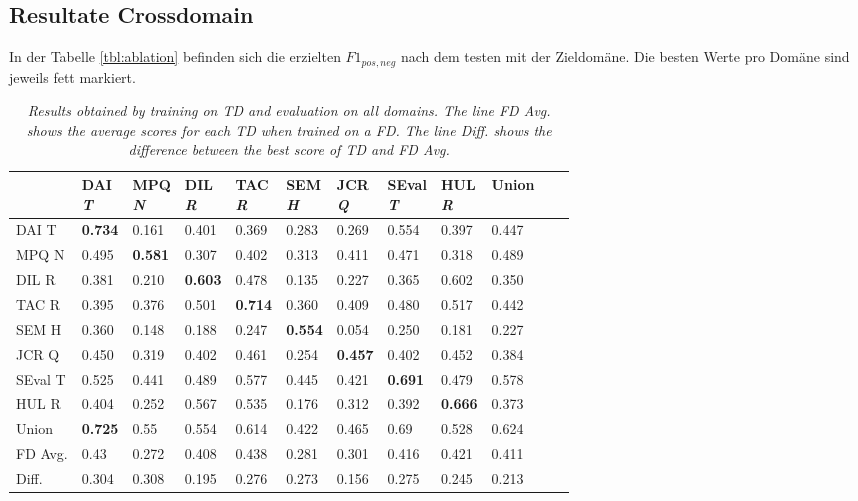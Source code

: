 \subsection{Resultate Crossdomain}\label{subsec:Resultate Crossdomain}
In der Tabelle \ref{tbl:ablation} befinden sich die erzielten $F1_{pos,neg}$ nach dem testen mit der Zieldomäne. Die besten Werte pro Domäne sind jeweils fett markiert.
\begin{table}[!t]
	\centering
	\small
	
	\begin{tabular}{l|lllllllll|ll}
		\backslashbox{Train}{Test}
		&  \specialcell{DAI \\\textit{T}}
		&  \specialcell{MPQ \\\textit{N}}
		&  \specialcell{DIL \\\textit{R}}
		&  \specialcell{TAC \\\textit{R}}
		&  \specialcell{SEM \\\textit{H}}
		&  \specialcell{JCR \\\textit{Q}}
		&  \specialcell{SEval \\\textit{T}}
		&  \specialcell{HUL \\\textit{R}}	& Union \\
		
		\hline
		DAI T	&\textbf{0.734}	&0.161	&0.401	&0.369	&0.283	&0.269	&0.554	&0.397	&0.447 \\
		MPQ N 	&0.495	&\textbf{0.581}	&0.307	&0.402	&0.313	&0.411	&0.471	&0.318	&0.489 \\
		DIL R	&0.381	&0.210	&\textbf{0.603}	&0.478	&0.135	&0.227	&0.365	&0.602	&0.350 \\
		TAC R	&0.395	&0.376	&0.501	&\textbf{0.714}	&0.360	&0.409	&0.480	&0.517	&0.442 \\
		SEM H	&0.360	&0.148	&0.188	&0.247	&\textbf{0.554}	&0.054	&0.250	&0.181	&0.227 \\
		JCR Q	&0.450	&0.319	&0.402	&0.461	&0.254	&\textbf{0.457}	&0.402	&0.452	&0.384 \\
		SEval T	&0.525	&0.441	&0.489	&0.577	&0.445	&0.421	&\textbf{0.691}	&0.479	&0.578 \\
		HUL R	&0.404	&0.252	&0.567	&0.535	&0.176	&0.312	&0.392	&\textbf{0.666}	&0.373 \\
		\hline
		Union 	&\textbf{0.725}	&0.55	&0.554	&0.614	&0.422	&0.465	&0.69	&0.528	&0.624 \\
		\hline
		\hline
		FD Avg. &0.43	&0.272	&0.408	&0.438	&0.281	&0.301	&0.416	&0.421	&0.411 \\
		Diff.	&0.304	&0.308	&0.195	&0.276	&0.273	&0.156	&0.275	&0.245	&0.213 \\
		
	\end{tabular}
	\caption{\textit{Results obtained by training on TD and evaluation on all domains. The line \emph{FD Avg.} shows the average scores for each TD when trained on a FD. The line \emph{Diff.} shows the difference between the best score of TD and FD Avg.}}
	\label{tbl:cross-domain}
\end{table}
